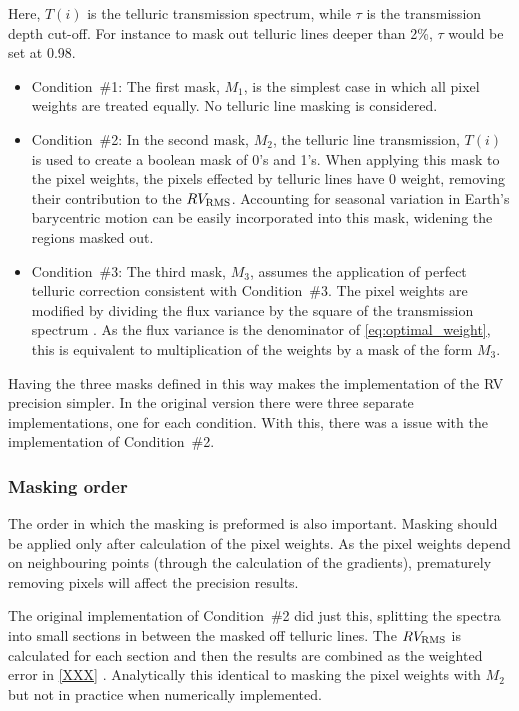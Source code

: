 Here, \(T(i)\) is the telluric transmission spectrum, while \(\tau\) is the transmission depth cut-off.
For instance to mask out telluric lines deeper than 2\%,  \(\tau\) would be set at 0.98.

\begin{itemize}
    \item Condition~\#1:
    The first mask, \(M_1\), is the simplest case in which all pixel weights are treated equally.
No telluric line masking is considered.

    \item Condition~\#2:
    In the second mask, \(M_2\), the telluric line transmission, \(T(i)\) is used to create a boolean mask of 0's and 1's.
When applying this mask to the pixel weights, the pixels effected by telluric lines have 0 weight, removing their contribution to the {\red{} \(RV_{\textrm{RMS}}\)}.
Accounting for seasonal variation in Earth's barycentric motion can be easily incorporated into this mask, widening the regions masked out.

    \item Condition~\#3:
    The third mask, \(M_3\), assumes the application of perfect telluric correction consistent with Condition~\#3.
The pixel weights are modified by dividing the flux variance by the square of the transmission spectrum .
As the flux variance is the denominator of \cref{eq:optimal_weight}, this is equivalent to multiplication of the weights by a mask of the form \(M_3\).
\end{itemize}

Having the three masks defined in this way makes the implementation of the {RV} precision simpler.
In the original version there were three separate implementations, one for each condition.
With this,  there was a issue with the implementation of Condition~\#2.

\subsubsection{Masking order}
\label{subsubsec:masking_order}
The order in which the masking is preformed is also important.
Masking should be applied only after calculation of the pixel weights.
As the pixel weights depend on neighbouring points (through the calculation of the gradients), prematurely removing pixels will affect the precision results.

The original implementation of Condition~\#2 did just this, splitting the spectra into small sections in between the masked off telluric lines.
The {\red{}\(RV_{\textrm{RMS}}\)} is calculated for each section and then the results are combined as the weighted error in {\red{} \cref{XXX}} .
Analytically this identical to masking the pixel weights with \(M_2\) but not in practice when numerically implemented. 

